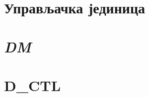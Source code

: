 \begin{appendices}

\lstset{numbers=left, numberstyle=\tiny, stepnumber=1, numbersep=5pt}

\chapter{Управљачка јединица}\label{sec.control}


\chapter{\textit{\acrfull{DM}}}\label{sec.dm}


\chapter{\textbf{D\_CTL}}\label{sec.dctl}


\end{appendices}
